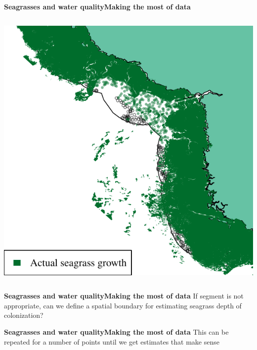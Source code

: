 \documentclass[serif]{beamer}\usepackage[]{graphicx}\usepackage[]{color}
\makeatletter
\def\maxwidth{ %
  \ifdim\Gin@nat@width>\linewidth
    \linewidth
  \else
    \Gin@nat@width
  \fi
}
\newenvironment{knitrout}{}{} %
\makeatother
\begin{document}
\begin{frame}{\textbf{Seagrasses and water quality}}{\textbf{Making the most of data}}
\begin{columns}[T]
\begin{column}{0.45\textwidth}
\begin{knitrout}
{\centering \includegraphics[width=\maxwidth]{fig//docfail2} 

}



\end{knitrout}
\end{column}
\end{columns}
\end{frame}


\begin{frame}{\textbf{Seagrasses and water quality}}{\textbf{Making the most of data}}
If segment is not appropriate, can we define a spatial boundary for estimating seagrass depth of colonization?
\begin{center}
\end{center}
\end{frame}


\begin{frame}{\textbf{Seagrasses and water quality}}{\textbf{Making the most of data}}
This can be repeated for a number of points until we get estimates that make sense
\begin{center}
\end{center}
\end{frame}
\end{document}
